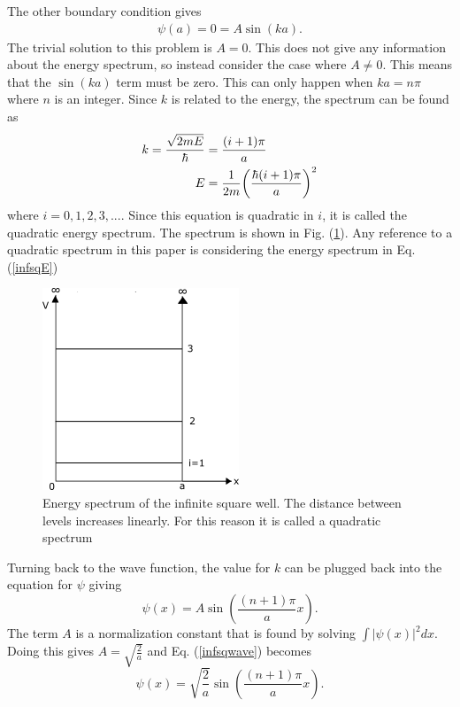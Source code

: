 The other boundary condition gives
\begin{align}
    \psi(a)=0=A\sin(ka).
\end{align}
The trivial solution to this problem is $A=0$. This does not give any information about the energy spectrum, so instead consider the case where $A\neq 0$. This means that the $\sin(ka)$ term must be zero. This can only happen when $ka=n\pi$ where $n$ is an integer. Since $k$ is related to the energy, the spectrum can be found as
\begin{align}
    k=\frac{\sqrt{2mE}}{\hbar}&=\frac{(i+1)\pi}{a}\\
    E&=\frac{1}{2m} \qty(\frac{\hbar (i+1)\pi}{a})^2 \label{infsqE}
\end{align}
where $i=0,1,2,3,...$. Since this equation is quadratic in $i$, it is called the quadratic energy spectrum. The spectrum is shown in Fig. (\ref{fig:Energy spectrum of the infinite square well}). Any reference to a quadratic spectrum in this paper is considering the energy spectrum in Eq.\@ (\ref{infsqE})
\begin{figure}[H]
    \centering
    \includegraphics[scale=1.0]{figures/pdf/sqwellspec.png}
    \caption{Energy spectrum of the infinite square well. The distance between levels increases linearly. For this reason it is called a quadratic spectrum}
    \label{fig:Energy spectrum of the infinite square well}
\end{figure}
Turning back to the wave function, the value for $k$ can be plugged back into the equation for $\psi$ giving
\begin{equation}
    \psi(x)=A\sin(\frac{(n+1)\pi}{a}x). \label{infsqwave}
\end{equation}
The term $A$ is a normalization constant that is found by solving $\int|\psi(x)|^2 dx$. Doing this gives $A=\sqrt{\frac{2}{a}}$ and Eq. (\ref{infsqwave}) becomes 
\begin{equation}
    \psi(x)=\sqrt{\frac{2}{a}}\sin(\frac{(n+1)\pi}{a}x).
\end{equation}